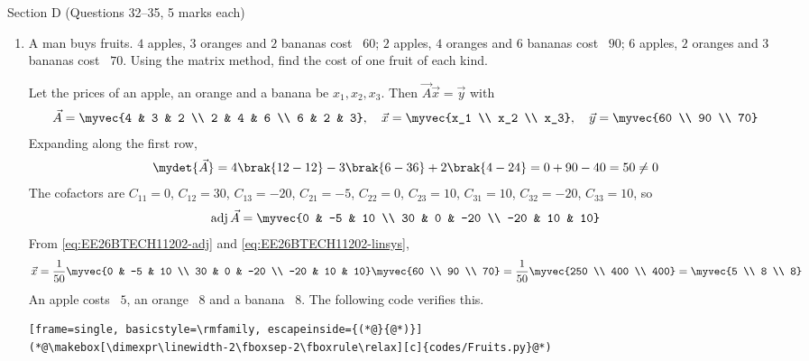 \vspace{2mm}
\noindent Section D (Questions 32--35, 5 marks each)
\begin{enumerate}[label=\thesubsection.\arabic*, ref=\thesubsection.\theenumi, start=32]
\item A man buys fruits. $4$ apples, $3$ oranges and $2$ bananas cost \rupee~$60$; $2$ apples, $4$ oranges and $6$ bananas cost \rupee~$90$; $6$ apples, $2$ oranges and $3$ bananas cost \rupee~$70$. Using the matrix method, find the cost of one fruit of each kind.
\par\solution
Let the prices of an apple, an orange and a banana be $x_1, x_2, x_3$. Then $\vec{A}\vec{x} = \vec{y}$ with
\begin{align}
	\vec{A} = \myvec{4 & 3 & 2 \\ 2 & 4 & 6 \\ 6 & 2 & 3}, \quad
	\vec{x} = \myvec{x_1 \\ x_2 \\ x_3}, \quad
	\vec{y} = \myvec{60 \\ 90 \\ 70}
\end{align}
Expanding along the first row,
\begin{align}
	\mydet{\vec{A}} = 4\brak{12-12} - 3\brak{6-36} + 2\brak{4-24} = 0 + 90 - 40 = 50 \ne 0
\end{align}
The cofactors are $C_{11}=0$, $C_{12}=30$, $C_{13}=-20$, $C_{21}=-5$, $C_{22}=0$, $C_{23}=10$, $C_{31}=10$, $C_{32}=-20$, $C_{33}=10$, so
\begin{align}
	\text{adj}\,\vec{A} = \myvec{0 & -5 & 10 \\ 30 & 0 & -20 \\ -20 & 10 & 10}
\end{align}
From \eqref{eq:EE26BTECH11202-adj} and \eqref{eq:EE26BTECH11202-linsys},
\begin{align}
	\vec{x} = \frac{1}{50}\myvec{0 & -5 & 10 \\ 30 & 0 & -20 \\ -20 & 10 & 10}\myvec{60 \\ 90 \\ 70}
	= \frac{1}{50}\myvec{250 \\ 400 \\ 400} = \myvec{5 \\ 8 \\ 8}
\end{align}
An apple costs \rupee~$5$, an orange \rupee~$8$ and a banana \rupee~$8$.
The following code verifies this.
\begin{lstlisting}[frame=single, basicstyle=\rmfamily, escapeinside={(*@}{@*)}]
(*@\makebox[\dimexpr\linewidth-2\fboxsep-2\fboxrule\relax][c]{codes/Fruits.py}@*)
\end{lstlisting}


\end{enumerate}

